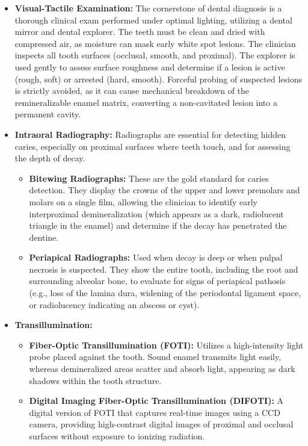 \begin{itemize}
    \item \textbf{Visual-Tactile Examination:} The cornerstone of dental diagnosis is a thorough clinical exam performed under optimal lighting, utilizing a dental mirror and dental explorer. The teeth must be clean and dried with compressed air, as moisture can mask early white spot lesions. The clinician inspects all tooth surfaces (occlusal, smooth, and proximal). The explorer is used gently to assess surface roughness and determine if a lesion is active (rough, soft) or arrested (hard, smooth). Forceful probing of suspected lesions is strictly avoided, as it can cause mechanical breakdown of the remineralizable enamel matrix, converting a non-cavitated lesion into a permanent cavity.
    \item \textbf{Intraoral Radiography:} Radiographs are essential for detecting hidden caries, especially on proximal surfaces where teeth touch, and for assessing the depth of decay.
    \begin{itemize}
        \item \textbf{Bitewing Radiographs:} These are the gold standard for caries detection. They display the crowns of the upper and lower premolars and molars on a single film, allowing the clinician to identify early interproximal demineralization (which appears as a dark, radiolucent triangle in the enamel) and determine if the decay has penetrated the dentine.
        \item \textbf{Periapical Radiographs:} Used when decay is deep or when pulpal necrosis is suspected. They show the entire tooth, including the root and surrounding alveolar bone, to evaluate for signs of periapical pathosis (e.g., loss of the lamina dura, widening of the periodontal ligament space, or radiolucency indicating an abscess or cyst).
    \end{itemize}
    \item \textbf{Transillumination:}
    \begin{itemize}
        \item \textbf{Fiber-Optic Transillumination (FOTI):} Utilizes a high-intensity light probe placed against the tooth. Sound enamel transmits light easily, whereas demineralized areas scatter and absorb light, appearing as dark shadows within the tooth structure.
        \item \textbf{Digital Imaging Fiber-Optic Transillumination (DIFOTI):} A digital version of FOTI that captures real-time images using a CCD camera, providing high-contrast digital images of proximal and occlusal surfaces without exposure to ionizing radiation.

\end{itemize}
\end{itemize}
